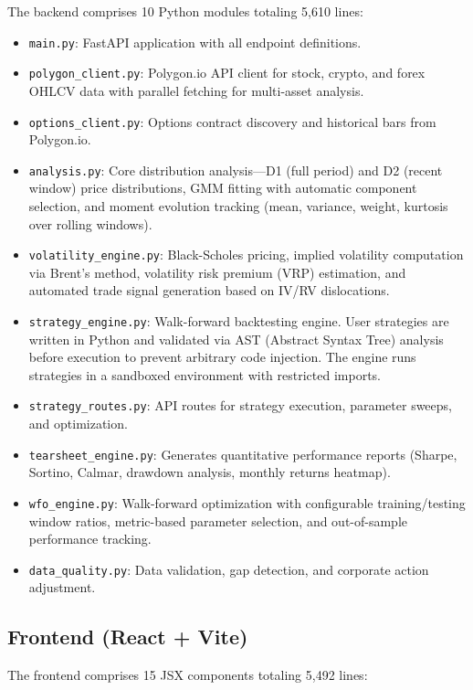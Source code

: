 \documentclass[11pt]{article}
\begin{document}
The backend comprises 10 Python modules totaling 5,610 lines:

\begin{itemize}[nosep]
    \item \texttt{main.py}: FastAPI application with all endpoint definitions.
    \item \texttt{polygon\_client.py}: Polygon.io API client for stock, crypto, and forex OHLCV data with parallel fetching for multi-asset analysis.
    \item \texttt{options\_client.py}: Options contract discovery and historical bars from Polygon.io.
    \item \texttt{analysis.py}: Core distribution analysis---D1 (full period) and D2 (recent window) price distributions, GMM fitting with automatic component selection, and moment evolution tracking (mean, variance, weight, kurtosis over rolling windows).
    \item \texttt{volatility\_engine.py}: Black-Scholes pricing, implied volatility computation via Brent's method, volatility risk premium (VRP) estimation, and automated trade signal generation based on IV/RV dislocations.
    \item \texttt{strategy\_engine.py}: Walk-forward backtesting engine. User strategies are written in Python and validated via AST (Abstract Syntax Tree) analysis before execution to prevent arbitrary code injection. The engine runs strategies in a sandboxed environment with restricted imports.
    \item \texttt{strategy\_routes.py}: API routes for strategy execution, parameter sweeps, and optimization.
    \item \texttt{tearsheet\_engine.py}: Generates quantitative performance reports (Sharpe, Sortino, Calmar, drawdown analysis, monthly returns heatmap).
    \item \texttt{wfo\_engine.py}: Walk-forward optimization with configurable training/testing window ratios, metric-based parameter selection, and out-of-sample performance tracking.
    \item \texttt{data\_quality.py}: Data validation, gap detection, and corporate action adjustment.
\end{itemize}

\subsection{Frontend (React + Vite)}

The frontend comprises 15 JSX components totaling 5,492 lines:
\end{document}
